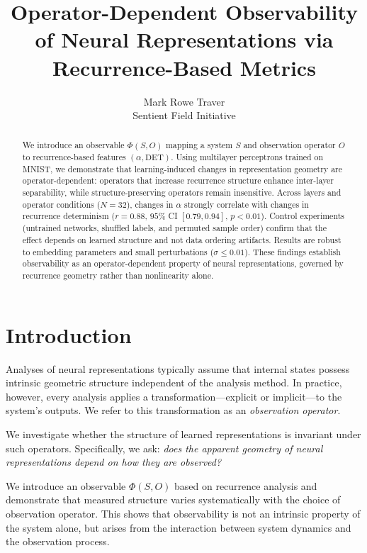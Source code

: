\documentclass[11pt]{article}
\title{Operator-Dependent Observability of Neural Representations via Recurrence-Based Metrics}
\author{
Mark Rowe Traver \\
Sentient Field Initiative
}
\date{}
\begin{document}
\maketitle

\begin{abstract}
	We introduce an observable $\Phi(S, O)$ mapping a system $S$ and observation operator $O$ to recurrence-based features $(\alpha, \mathrm{DET})$. Using multilayer perceptrons trained on MNIST, we demonstrate that learning-induced changes in representation geometry are operator-dependent: operators that increase recurrence structure enhance inter-layer separability, while structure-preserving operators remain insensitive. Across layers and operator conditions ($N=32$), changes in $\alpha$ strongly correlate with changes in recurrence determinism ($r = 0.88$, $95\%$ CI $[0.79, 0.94]$, $p < 0.01$). Control experiments (untrained networks, shuffled labels, and permuted sample order) confirm that the effect depends on learned structure and not data ordering artifacts. Results are robust to embedding parameters and small perturbations ($\sigma \leq 0.01$). These findings establish observability as an operator-dependent property of neural representations, governed by recurrence geometry rather than nonlinearity alone.
\end{abstract}

\section{Introduction}

Analyses of neural representations typically assume that internal states possess intrinsic geometric structure independent of the analysis method. In practice, however, every analysis applies a transformation—explicit or implicit—to the system's outputs. We refer to this transformation as an \textit{observation operator}.

We investigate whether the structure of learned representations is invariant under such operators. Specifically, we ask: \textit{does the apparent geometry of neural representations depend on how they are observed?}

We introduce an observable $\Phi(S, O)$ based on recurrence analysis and demonstrate that measured structure varies systematically with the choice of observation operator. This shows that observability is not an intrinsic property of the system alone, but arises from the interaction between system dynamics and the observation process.
\end{document}
